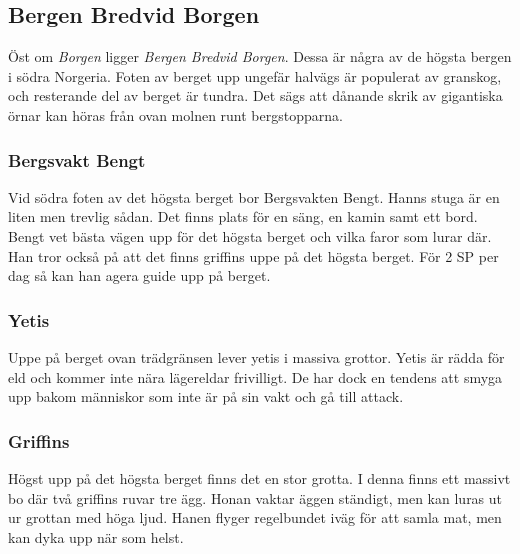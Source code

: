 \subsection{Bergen Bredvid Borgen}
\label{bergenBredvidBorgen}
Öst om \textit{Borgen} ligger \textit{Bergen Bredvid Borgen}. Dessa är några av de högsta bergen i södra Norgeria. Foten av berget upp ungefär halvägs är populerat av granskog, och resterande del av berget är tundra. Det sägs att dånande skrik av gigantiska örnar kan höras från ovan molnen runt bergstopparna.

\subsubsection{Bergsvakt Bengt}
\label{bergsvaktBengt}
Vid södra foten av det högsta berget bor Bergsvakten Bengt. Hanns stuga är en liten men trevlig sådan. Det finns plats för en säng, en kamin samt ett bord. Bengt vet bästa vägen upp för det högsta berget och vilka faror som lurar där. Han tror också på att det finns griffins uppe på det högsta berget. För 2 SP per dag så kan han agera guide upp på berget.

\subsubsection{Yetis}
Uppe på berget ovan trädgränsen lever yetis i massiva grottor. Yetis är rädda för eld och kommer inte nära lägereldar frivilligt. De har dock en tendens att smyga upp bakom människor som inte är på sin vakt och gå till attack.

\subsubsection{Griffins}
Högst upp på det högsta berget finns det en stor grotta. I denna finns ett massivt bo där två griffins ruvar tre ägg. Honan vaktar äggen ständigt, men kan luras ut ur grottan med höga ljud. Hanen flyger regelbundet iväg för att samla mat, men kan dyka upp när som helst.